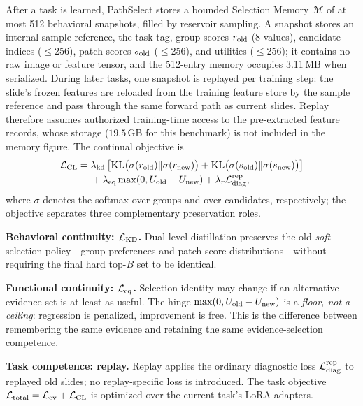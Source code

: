 \documentclass{article}
\def\L{{\cal L}}
\newcommand{\Mem}{\mathcal{M}}
\begin{document}
After a task is learned, PathSelect stores a bounded Selection Memory $\Mem$ of at most 512 behavioral snapshots, filled by reservoir sampling. A snapshot stores an internal sample reference, the task tag, group scores $r_{\rm old}$ (8 values), candidate indices ($\le$256), patch scores $s_{\rm old}$ ($\le$256), and utilities ($\le$256); it contains no raw image or feature tensor, and the 512-entry memory occupies 3.11\,MB when serialized. During later tasks, one snapshot is replayed per training step: the slide's frozen features are reloaded from the training feature store by the sample reference and pass through the same forward path as current slides. Replay therefore assumes authorized training-time access to the pre-extracted feature records, whose storage ($19.5$\,GB for this benchmark) is not included in the memory figure. The continual objective is
\begin{align}
\L_{\mathrm{CL}}
={}&
\lambda_{\mathrm{kd}}
\left[
\mathrm{KL}\bigl(\sigma(r_{\mathrm{old}})\Vert \sigma(r_{\mathrm{new}})\bigr)
+
\mathrm{KL}\bigl(\sigma(s_{\mathrm{old}})\Vert \sigma(s_{\mathrm{new}})\bigr)
\right]
\nonumber\\
&+
\lambda_{\mathrm{eq}}
\max(0,U_{\mathrm{old}}-U_{\mathrm{new}})
+
\lambda_r \L_{\mathrm{diag}}^{\mathrm{rep}},
\label{eq:lcl}
\end{align}
where $\sigma$ denotes the softmax over groups and over candidates, respectively; the objective separates three complementary preservation roles.

\textbf{Behavioral continuity: $\L_{\rm KD}$.}
Dual-level distillation preserves the old \emph{soft} selection policy---group preferences and patch-score distributions---without requiring the final hard top-$B$ set to be identical.

\textbf{Functional continuity: $\L_{\rm eq}$.}
Selection identity may change if an alternative evidence set is at least as useful. The hinge $\max(0,U_{\rm old}-U_{\rm new})$ is a \emph{floor, not a ceiling}: regression is penalized, improvement is free. This is the difference between remembering the same evidence and retaining the same evidence-selection competence.

\textbf{Task competence: replay.}
Replay applies the ordinary diagnostic loss $\L_{\mathrm{diag}}^{\mathrm{rep}}$ to replayed old slides; no replay-specific loss is introduced. The task objective $\L_{\mathrm{total}}=\L_{\mathrm{ev}}+\L_{\mathrm{CL}}$ is optimized over the current task's LoRA adapters.

\end{document}
